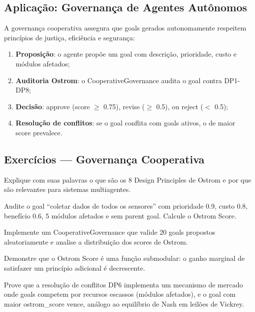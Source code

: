 \subsection{Aplicação: Governança de Agentes Autônomos}

A governança cooperativa assegura que goals gerados autonomamente
respeitem princípios de justiça, eficiência e segurança:

\begin{enumerate}
\item \textbf{Proposição}: o agente propõe um goal com descrição,
prioridade, custo e módulos afetados;
\item \textbf{Auditoria Ostrom}: o CooperativeGovernance audita o goal
contra DP1-DP8;
\item \textbf{Decisão}: approve (score $\geq$ 0.75), revise
($\geq$ 0.5), ou reject ($<$ 0.5);
\item \textbf{Resolução de conflitos}: se o goal conflita com goals
ativos, o de maior score prevalece.
\end{enumerate}

\subsection{Exercícios — Governança Cooperativa}
\begin{exercicio}
Explique com suas palavras o que são os 8 Design Principles de Ostrom
e por que são relevantes para sistemas multiagentes.
\end{exercicio}
\begin{exercicio}
Audite o goal ``coletar dados de todos os sensores'' com prioridade
0.9, custo 0.8, benefício 0.6, 5 módulos afetados e sem parent goal.
Calcule o Ostrom Score.
\end{exercicio}
\begin{exercicio}
Implemente um CooperativeGovernance que valide 20 goals propostos
aleatoriamente e analise a distribuição dos scores de Ostrom.
\end{exercicio}
\begin{exercicio}
Demonstre que o Ostrom Score é uma função submodular: o ganho marginal
de satisfazer um princípio adicional é decrescente.
\end{exercicio}
\begin{exercicio}
Prove que a resolução de conflitos DP6 implementa um mecanismo de
mercado onde goals competem por recursos escassos (módulos afetados),
e o goal com maior ostrom\_score vence, análogo ao equilíbrio de
Nash em leilões de Vickrey.
\end{exercicio}

